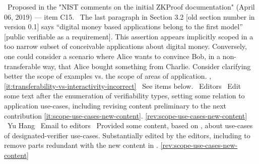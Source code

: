 \newcol \ccontext\ Proposed in the "NIST comments on the initial ZKProof documentation" (April 06, 2019) --- item C15.
				\propContrib\ The last paragraph in Section 3.2 [old section number in version 0.1] says ``digital money based applications belong to the first model'' [public verifiable as a requirement]. This assertion appears implicitly scoped in a too narrow subset of conceivable applications about digital money. Conversely, one could consider a scenario where Alice wants to convince Bob, in a non-transferable way, that Alice bought something from Charlie. Consider clarifying better the scope of examples vs. the scope of areas of application.
\newcol {}, \ref{it:transferability-vs-interactivity-incorrect}
\newcol \Chan\ See items below.
\newcol 
\rowendL
\newcol 
\newcol {}
\newcol \contributors\ Editors
				\Chan\ Edit some text after the enumeration of verifiability types, 
				setting some relation to application use-cases, including revising
				content preliminary to the next contribution \ref{it:scope-use-cases-new-content}.
\newcol \ref{rev:scope-use-cases-new-content}
\rowendL
\newcol 
\newcol {}
\newcol \contributors\ Yu Hang
				\submit\ Email to editors
				\Chan\ Provided some content, based on \cite{1996:eurocrypt:designated-verifier-proofs}, 
				about use-cases of designated-verifier use-cases. 
					Substantially edited by the editors, including to remove parts redundant with the new 
				content in .
\newcol \ref{rev:scope-use-cases-new-content}
\rowendL
\myendIssue



